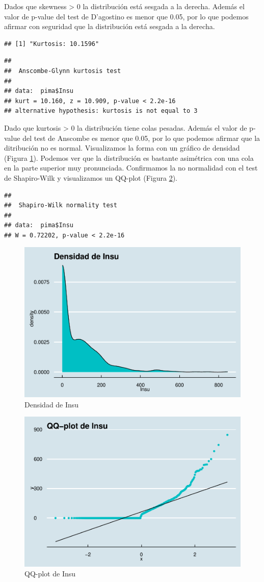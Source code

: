 \documentclass[
]{article}
\begin{document}
Dados que skewness \textgreater{} 0 la distribución está sesgada a la
derecha. Además el valor de p-value del test de D'agostino es menor que
0.05, por lo que podemos afirmar con seguridad que la distribución está
sesgada a la derecha.

\begin{verbatim}
## [1] "Kurtosis: 10.1596"
\end{verbatim}

\begin{verbatim}
## 
##  Anscombe-Glynn kurtosis test
## 
## data:  pima$Insu
## kurt = 10.160, z = 10.909, p-value < 2.2e-16
## alternative hypothesis: kurtosis is not equal to 3
\end{verbatim}

Dado que kurtosis \textgreater{} 0 la distribución tiene colas pesadas.
Además el valor de p-value del test de Anscombe es menor que 0.05, por
lo que podemos afirmar que la ditribución no es normal. Visualizamos la
forma con un gráfico de densidad (Figura \ref{fig:dens_insu}). Podemos
ver que la distribución es bastante asimétrica con una cola en la parte
superior muy pronunciada. Confirmamos la no normalidad con el test de
Shapiro-Wilk y visualizamos un QQ-plot (Figura \ref{fig:qq_insu}).

\begin{verbatim}
## 
##  Shapiro-Wilk normality test
## 
## data:  pima$Insu
## W = 0.72202, p-value < 2.2e-16
\end{verbatim}

\begin{figure}

{\centering \includegraphics[width=0.5\linewidth]{pima-clasificacion_files/figure-latex/dens_insu-1} 

}

\caption{Densidad de Insu}\label{fig:dens_insu}
\end{figure}

\begin{figure}

{\centering \includegraphics[width=0.5\linewidth]{pima-clasificacion_files/figure-latex/qq_insu-1} 

}

\caption{QQ-plot de Insu}\label{fig:qq_insu}
\end{figure}
\end{document}
